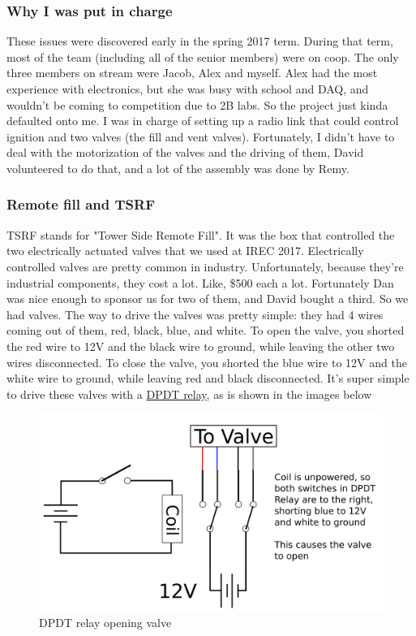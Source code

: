 \documentclass[11pt]{article}
\begin{document}
\subsubsection{Why I was put in charge}
\label{sec:orgd2ffc91}

These issues were discovered early in the spring 2017 term. During that term,
most of the team (including all of the senior members) were on coop. The only
three members on stream were Jacob, Alex and myself. Alex had the most
experience with electronics, but she was busy with school and DAQ, and wouldn't
be coming to competition due to 2B labs. So the project just kinda defaulted
onto me. I was in charge of setting up a radio link that could control ignition
and two valves (the fill and vent valves). Fortunately, I didn't have to deal
with the motorization of the valves and the driving of them, David volunteered
to do that, and a lot of the assembly was done by Remy.

\subsubsection{Remote fill and TSRF}
\label{sec:org0f8a52e}

TSRF stands for "Tower Side Remote Fill". It was the box that controlled the two
electrically actuated valves that we used at IREC 2017. Electrically controlled
valves are pretty common in industry. Unfortunately, because they're industrial
components, they cost a lot. Like, \$500 each a lot. Fortunately Dan was nice
enough to sponsor us for two of them, and David bought a third. So we had
valves. The way to drive the valves was pretty simple: they had 4 wires coming
out of them, red, black, blue, and white. To open the valve, you shorted the red
wire to 12V and the black wire to ground, while leaving the other two wires
disconnected. To close the valve, you shorted the blue wire to 12V and the white
wire to ground, while leaving red and black disconnected. It's super simple to
drive these valves with a \href{https://en.wikipedia.org/wiki/Relay\#Pole\_and\_throw}{DPDT relay}, as is shown in the images below

\begin{figure}[htbp]
\centering
\includegraphics[width=.9\linewidth]{./images/dpdt_opening.png}
\caption{\label{fig:orga38b287}
DPDT relay opening valve}
\end{figure}
\end{document}
